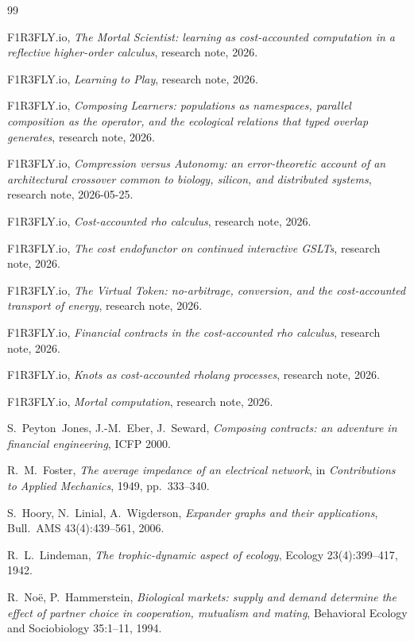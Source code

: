 \documentclass[11pt]{article}
\theoremstyle{plain}
\theoremstyle{definition}
\theoremstyle{remark}
\begin{document}
\begin{thebibliography}{99}

 F1R3FLY.io, \emph{The Mortal Scientist: learning as
cost-accounted computation in a reflective higher-order calculus}, research
note, 2026.

 F1R3FLY.io, \emph{Learning to Play}, research note, 2026.

 F1R3FLY.io, \emph{Composing Learners: populations as
namespaces, parallel composition as the operator, and the ecological
relations that typed overlap generates}, research note, 2026.

 F1R3FLY.io, \emph{Compression versus Autonomy: an
error-theoretic account of an architectural crossover common to biology,
silicon, and distributed systems}, research note, 2026-05-25.

 F1R3FLY.io, \emph{Cost-accounted rho calculus}, research
note, 2026.

 F1R3FLY.io, \emph{The cost endofunctor on continued
interactive GSLTs}, research note, 2026.

 F1R3FLY.io, \emph{The Virtual Token: no-arbitrage,
conversion, and the cost-accounted transport of energy}, research note,
2026.

 F1R3FLY.io, \emph{Financial contracts in the
cost-accounted rho calculus}, research note, 2026.

 F1R3FLY.io, \emph{Knots as cost-accounted rholang
processes}, research note, 2026.

 F1R3FLY.io, \emph{Mortal computation}, research note, 2026.

 S.~Peyton~Jones, J.-M.~Eber, J.~Seward, \emph{Composing
contracts: an adventure in financial engineering}, ICFP 2000.

 R.~M.~Foster, \emph{The average impedance of an electrical
network}, in \emph{Contributions to Applied Mechanics}, 1949, pp.~333--340.

 S.~Hoory, N.~Linial, A.~Wigderson, \emph{Expander graphs
and their applications}, Bull.\ AMS 43(4):439--561, 2006.

 R.~L.~Lindeman, \emph{The trophic-dynamic aspect of
ecology}, Ecology 23(4):399--417, 1942.

 R.~No\"e, P.~Hammerstein, \emph{Biological markets: supply
and demand determine the effect of partner choice in cooperation, mutualism
and mating}, Behavioral Ecology and Sociobiology 35:1--11, 1994.


\end{thebibliography}
\end{document}
